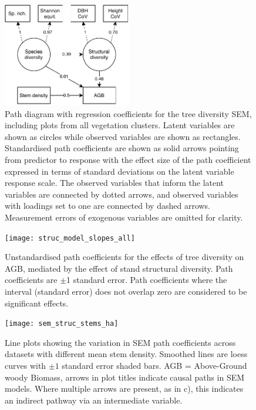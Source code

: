 \documentclass[12pt,a4paper]{article}
\begin{document}
\begin{figure}[H]
\centering
	\includegraphics[width=0.5\textwidth]{struc.drawio}
	\caption{Path diagram with regression coefficients for the tree diversity SEM, including plots from all vegetation clusters. Latent variables are shown as circles while observed variables are shown as rectangles. Standardised path coefficients are shown as solid arrows pointing from predictor to response with the effect size of the path coefficient expressed in terms of standard deviations on the latent variable response scale. The observed variables that inform the latent variables are connected by dotted arrows, and observed variables with loadings set to one are connected by dashed arrows. Measurement errors of exogenous variables are omitted for clarity.}
	\label{struc_mod}
\end{figure}
\newpage{}

\begin{figure}[H]
\centering
	\texttt{[image: struc\_model\_slopes\_all]}
	\caption{Unstandardised path coefficients for the effects of tree diversity on AGB, mediated by the effect of stand structural diversity. Path coefficients are $\pm$1 standard error. Path coefficients where the interval (standard error) does not overlap zero are considered to be significant effects.}
	\label{struc_model_slopes_all}
\end{figure}
\newpage{}

\begin{figure}[H]
\centering
	\texttt{[image: sem\_struc\_stems\_ha]}
	\caption{Line plots showing the variation in SEM path coefficients across datasets with different mean stem density. Smoothed lines are loess curves with $\pm1$ standard error shaded bars. AGB = Above-Ground woody Biomass, arrows in plot titles indicate causal paths in SEM models. Where multiple arrows are present, as in c), this indicates an indirect pathway via an intermediate variable.}
	\label{sem_struc_stems_ha}
\end{figure}
\newpage{}
\end{document}
